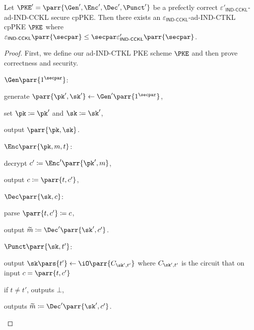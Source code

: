 \begin{theorem}
    Let \(\PKE' = \parr{\Gen',\Enc',\Dec',\Punct'}\) be a prefectly correct \(\varepsilon'_{\textsf{IND-CCKL}}\)-ad-IND-CCKL secure cpPKE.
    Then there exists an \(\varepsilon_{\textsf{IND-CCKL}}\)-ad-IND-CTKL cpPKE \(\PKE\) where \(\varepsilon_{\textsf{IND-CCKL}}\parr{\secpar} \leq \secpar \varepsilon'_{\textsf{IND-CCKL}}\parr{\secpar}\).
\end{theorem}

\begin{proof}
    First, we define our ad-IND-CTKL PKE scheme \(\PKE\) and then prove correctness and security.
    \begin{sitemize}
        \item \(\Gen\parr{1^\secpar}\):
        \begin{sitemize}
            \item generate \(\parr{\pk',\sk'} \gets \Gen'\parr{1^{\secpar}}\),
            \item set \(\pk \coloneqq \pk'\) and \(\sk \coloneqq \sk'\),
            \item output \(\parr{\pk,\sk}\).
        \end{sitemize}

        \item \(\Enc\parr{\pk,m,t}\):
        \begin{sitemize}
            \item decrypt \(c' \coloneqq \Enc'\parr{\pk',m}\),
            \item output \(c \coloneqq \parr{t,c'}\),
        \end{sitemize}

        \item \(\Dec\parr{\sk,c}\):
        \begin{sitemize}
            \item parse \(\parr{t,c'} \coloneqq c\),
            \item output \(\widetilde{m} \coloneqq \Dec'\parr{\sk',c'}\).
        \end{sitemize}

        \item \(\Punct\parr{\sk, t'}\):
        \begin{sitemize}
            \item output \(\sk\pars{t'} \gets \iO\parr{C_{\sk',t'}}\) where \(C_{\sk',t'}\) is the circuit that on input \(c = \parr{t,c'}\)
            \begin{sitemize}
                \item if \(t \neq t'\), outputs \(\bot\),
                \item outputs \(\widetilde{m} \coloneqq \Dec'\parr{\sk',c'}\).
            \end{sitemize}
        \end{sitemize}


\end{sitemize}
\end{proof}
